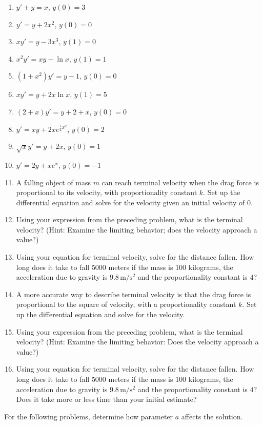 \documentclass{exercises}
\begin{document}
\begin{enumerate}[resume]
\item $y'+y=x$, $y(0)=3$
\item $y'=y+2x^{2}$, $y(0)=0$
\item $xy'=y-3x^{3}$, $y(1)=0$
\item $x^{2}y'=xy-\ln x$, $y(1)=1$
\item $(1+x^{2})y'=y-1$, $y(0)=0$
\item $xy'=y+2x\ln x$, $y(1)=5$
\item $(2+x)y'=y+2+x$, $y(0)=0$
\item $y'=xy+2xe^{\frac{1}{2}x^{2}}$, $y(0)=2$
\item $\sqrt{x}y'=y+2x$, $y(0)=1$
\item $y'=2y+xe^{x}$, $y(0)=-1$
\item A falling object of mass $m$ can reach terminal velocity when the drag force is proportional to its velocity, with proportionality constant $k$. Set up the differential equation and solve for the velocity given an initial velocity of $0$.
\item Using your expression from the preceding problem, what is the terminal velocity? (Hint: Examine the limiting behavior; does the velocity approach a value?)
\item \techrequired Using your equation for terminal velocity, solve for the distance fallen. How long does it take to fall $5000$ meters if the mass is $100$ kilograms, the acceleration due to gravity is $9.8\,\text{m}/\text{s}^{2}$ and the proportionality constant is $4$?
\item A more accurate way to describe terminal velocity is that the drag force is proportional to the square of velocity, with a proportionality constant $k$. Set up the differential equation and solve for the velocity.
\item Using your expression from the preceding problem, what is the terminal velocity? (Hint: Examine the limiting behavior: Does the velocity approach a value?)
\item \techrequired Using your equation for terminal velocity, solve for the distance fallen. How long does it take to fall $5000$ meters if the mass is $100$ kilograms, the acceleration due to gravity is $9.8\,\text{m}/\text{s}^{2}$ and the proportionality constant is $4$? Does it take more or less time than your initial estimate?
\end{enumerate}

For the following problems, determine how parameter $a$ affects the solution.
\end{document}
